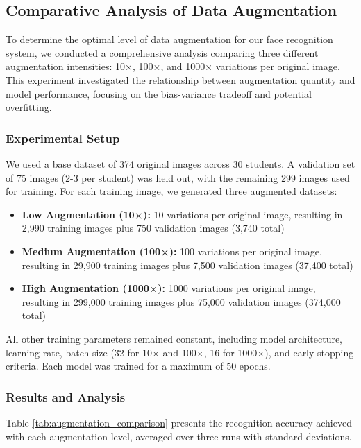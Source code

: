 \documentclass[conference]{IEEEtran}
\begin{document}
\subsection{Comparative Analysis of Data Augmentation}
To determine the optimal level of data augmentation for our face recognition system, we conducted a comprehensive analysis comparing three different augmentation intensities: 10×, 100×, and 1000× variations per original image. This experiment investigated the relationship between augmentation quantity and model performance, focusing on the bias-variance tradeoff and potential overfitting.

\subsubsection{Experimental Setup}
We used a base dataset of 374 original images across 30 students. A validation set of 75 images (2-3 per student) was held out, with the remaining 299 images used for training. For each training image, we generated three augmented datasets:
\begin{itemize}
\item \textbf{Low Augmentation (10×):} 10 variations per original image, resulting in 2,990 training images plus 750 validation images (3,740 total)
\item \textbf{Medium Augmentation (100×):} 100 variations per original image, resulting in 29,900 training images plus 7,500 validation images (37,400 total)
\item \textbf{High Augmentation (1000×):} 1000 variations per original image, resulting in 299,000 training images plus 75,000 validation images (374,000 total)
\end{itemize}

All other training parameters remained constant, including model architecture, learning rate, batch size (32 for 10× and 100×, 16 for 1000×), and early stopping criteria. Each model was trained for a maximum of 50 epochs.

\subsubsection{Results and Analysis}
Table \ref{tab:augmentation_comparison} presents the recognition accuracy achieved with each augmentation level, averaged over three runs with standard deviations.
\end{document}
